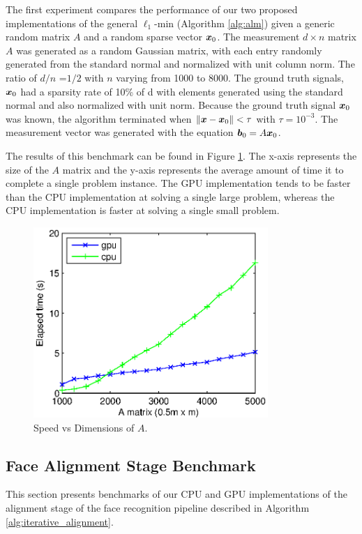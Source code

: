 \documentclass[10pt,twocolumn,letterpaper]{article}
\begin{document}
The first experiment compares the performance of our two proposed
implementations of the general $\ell_1$-min (Algorithm \eqref{alg:alm}) given a
generic random matrix $A$ and a random sparse vector ${\boldsymbol{x}}_0$.  The measurement
$d \times n$ matrix $A$ was generated as a random Gaussian matrix, with each
entry randomly generated from the standard normal and normalized with unit
column norm.  The ratio of $d/n$ =$1/2$ with $n$ varying from 1000 to 8000.
The ground truth signals, ${\boldsymbol{x}}_0$ had a sparsity rate of 10\% of d with
elements generated using the standard normal and also normalized with unit
norm.  Because the ground truth signal ${\boldsymbol{x}}_0$ was known, the algorithm
terminated when $\|{\boldsymbol x}-{\boldsymbol x}_0\| < \tau$ with $\tau=10^{-3}$.  The measurement
vector was generated with the equation ${\boldsymbol{b}}_0 = A {\boldsymbol{x}}_0$.   

The results of this benchmark can be found in Figure \ref{fig:random_data}.
The x-axis represents the size of the $A$ matrix and the y-axis represents the
average amount of time it to complete a single problem instance.  The GPU
implementation tends to be faster than the CPU implementation at solving a
single large problem, whereas the CPU implementation is faster at solving a
single small problem.  
\begin{figure}
\begin{center}
\includegraphics[width=3.5in]{figures/time_vs_matrix_size_constant_tol}
\end{center}
\caption{Speed vs Dimensions of $A$.}
\label{fig:random_data}
\end{figure}

\subsection{Face Alignment Stage Benchmark} 
\label{sec:alignment_benchmark}
This section presents benchmarks of our CPU and GPU implementations of the
alignment stage of the face recognition pipeline described in Algorithm
\ref{alg:iterative_alignment}.  
\end{document}
